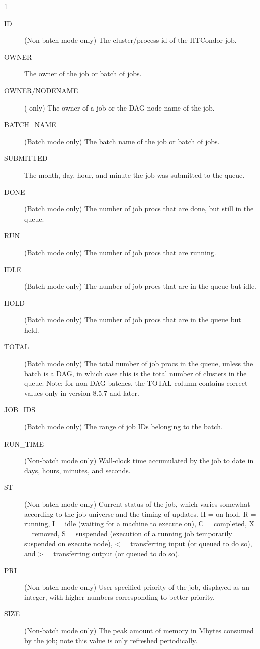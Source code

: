 \begin{ManPage}{\label{man-condor-q}}{1}
\begin{description}
\item[ID] (Non-batch mode only) The cluster/process id of the HTCondor job. 
\item[OWNER] The owner of the job or batch of jobs. 
\item[OWNER/NODENAME] ( only) The owner of a job or the
	DAG node name of the job.
\item[BATCH\_NAME] (Batch mode only) The batch name of the job or batch
	of jobs.
\item[SUBMITTED] The month, day, hour, and minute the job was submitted
	to the queue. 
\item[DONE] (Batch mode only) The number of job procs that are done, but
	still in the queue.
\item[RUN] (Batch mode only) The number of job procs that are running.
\item[IDLE] (Batch mode only) The number of job procs that are in the
	queue but idle.
\item[HOLD] (Batch mode only) The number of job procs that are in the
	queue but held.
\item[TOTAL] (Batch mode only) The total number of job procs in the
	queue, unless the batch is a DAG, in which case this is the total
	number of clusters in the queue.  Note:  for non-DAG batches,
	the TOTAL column contains correct values only in version 8.5.7
	and later.
\item[JOB\_IDS] (Batch mode only) The range of job IDs belonging to the batch.
\item[RUN\_TIME]  (Non-batch mode only) Wall-clock time accumulated by
	the job to date in days, hours, minutes, and seconds.  
\item[ST] (Non-batch mode only) Current status of the job, which varies
	somewhat according
	to the job universe and the timing of updates.
        H = on hold,
        R = running,
	I = idle
        (waiting for a machine to execute on), C = completed, 
        X = removed,
		S = suspended (execution of a running job temporarily suspended on execute node),
        < = transferring input (or queued to do so), and
        > = transferring output (or queued to do so). 
\item[PRI] (Non-batch mode only) User specified priority of the job,
	displayed as an integer, with higher numbers corresponding to better
	priority. 
\item[SIZE] (Non-batch mode only) The peak amount of memory in Mbytes
	consumed by the job; note this value is only refreshed periodically.

\end{description}
\end{ManPage}
